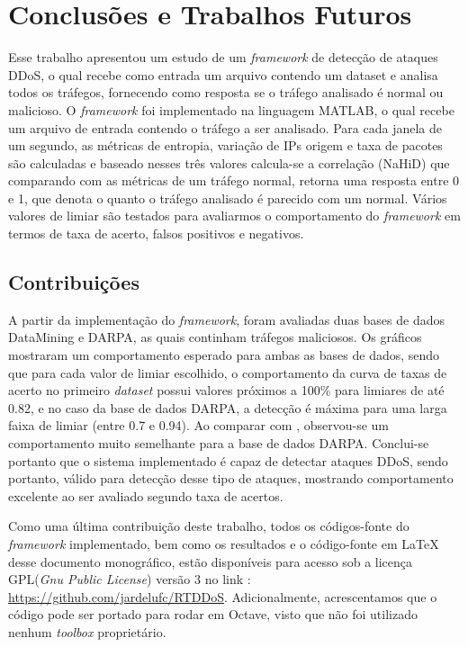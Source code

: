 \chapter[Conclusões e Trabalhos Futuros]{Conclusões e Trabalhos Futuros}
Esse trabalho apresentou um estudo de um \textit{framework} de detecção de ataques DDoS, o qual recebe como entrada um arquivo contendo um dataset e analisa todos os tráfegos, fornecendo como resposta se o tráfego analisado é normal ou malicioso. O \textit{framework} foi implementado na linguagem MATLAB, o qual recebe um arquivo de entrada contendo o tráfego a ser analisado. Para cada janela de um segundo, as métricas de entropia, variação de IPs origem e taxa de pacotes são calculadas e baseado nesses três valores  calcula-se a correlação (NaHiD) que comparando com as métricas de um tráfego normal, retorna uma resposta entre 0 e 1, que denota o quanto o tráfego analisado é parecido com um normal. Vários valores de limiar são testados para avaliarmos o comportamento do \textit{framework} em termos de taxa de acerto, falsos positivos e negativos.

\section{Contribuições}

A partir da implementação do \textit{framework}, foram avaliadas duas bases de dados DataMining e DARPA, as quais continham tráfegos maliciosos. Os gráficos mostraram um comportamento esperado para ambas as bases de dados, sendo que para cada valor de limiar escolhido, o comportamento da curva de taxas de acerto no primeiro \textit{dataset} possui valores próximos a 100\% para limiares de até 0.82, e no caso da base de dados DARPA, a detecção é máxima para uma larga faixa de limiar (entre 0.7 e 0.94). Ao comparar com \cite{HOQUE201748}, observou-se um comportamento muito semelhante para a base de dados DARPA. Conclui-se portanto que o sistema implementado é capaz de detectar ataques DDoS, sendo portanto, válido para detecção desse tipo de ataques, mostrando comportamento excelente ao ser avaliado segundo taxa de acertos. 

Como uma última contribuição deste trabalho, todos os códigos-fonte do \textit{framework} implementado, bem como os resultados e o código-fonte em \LaTeX \hspace{0.01cm} desse documento monográfico, estão disponíveis para acesso sob a licença GPL(\textit{Gnu Public License}) versão 3 no link : \url{https://github.com/jardelufc/RTDDoS}. Adicionalmente, acrescentamos que o código pode ser portado para rodar em Octave, visto que não foi utilizado nenhum \textit{toolbox} proprietário.   
